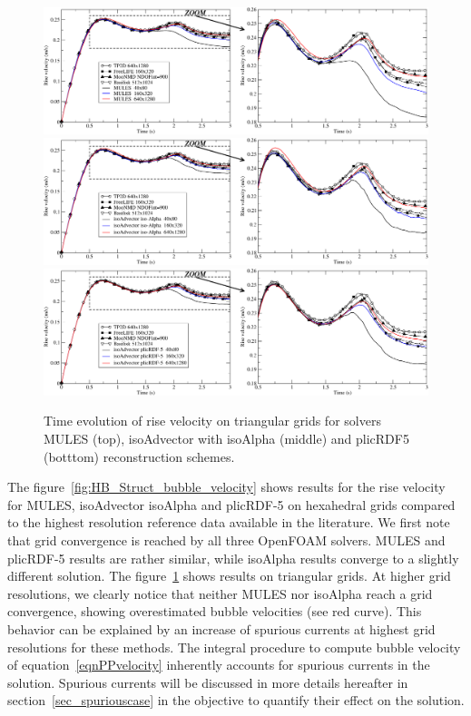 \documentclass[review]{elsarticle}
\begin{document}
\begin{figure}[!h]
\begin{center}
 \vspace{-1mm}
 \includegraphics[width=\textwidth]{figures/HysingB-uns_bubble_velocity_MULES.pdf}
 \includegraphics[width=\textwidth]{figures/HysingB-uns_bubble_velocity_isoAlpha.pdf}
 \includegraphics[width=\textwidth]{figures/HysingB-uns_bubble_velocity_plicRDF5.pdf}
 \vspace{-14mm}
\end{center}
\caption{Time evolution of rise velocity on triangular grids for solvers MULES (top), isoAdvector with isoAlpha (middle) and plicRDF5 (botttom) reconstruction schemes.}
\label{fig:HB_Uns_bubble_velocity}
\end{figure}
 
The figure~\ref{fig:HB_Struct_bubble_velocity} shows results for the rise velocity for MULES, isoAdvector isoAlpha and plicRDF-5 on hexahedral grids compared to the highest resolution reference data available in the literature. We first note that grid convergence is reached by all three OpenFOAM solvers. MULES and plicRDF-5 results are rather similar, while isoAlpha results converge to a slightly different solution. The figure~\ref{fig:HB_Uns_bubble_velocity} shows results on triangular grids. At higher grid resolutions, we clearly notice that neither MULES nor isoAlpha reach a grid convergence, showing overestimated bubble velocities (see red curve). This behavior can be explained by an increase of spurious currents at highest grid resolutions for these methods. The integral procedure to compute bubble velocity of equation~\ref{eqnPPvelocity} inherently accounts for spurious currents in the solution. Spurious currents will be discussed in more details hereafter in section~\ref{sec_spuriouscase} in the objective to quantify their effect on the solution. 
\end{document}
